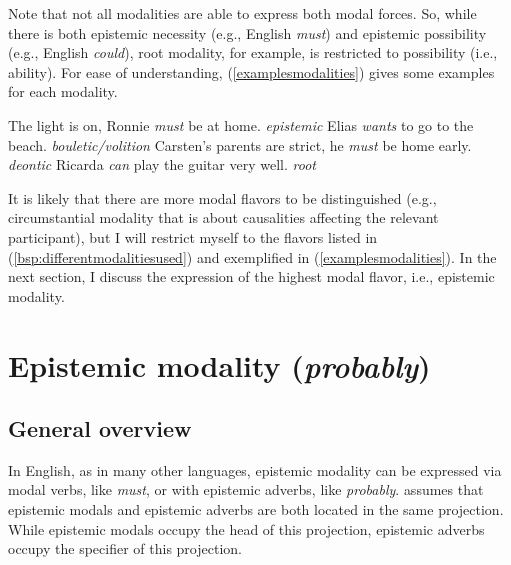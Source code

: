 \noindent Note that not all modalities are able to express both modal forces. So, while there is both epistemic necessity (e.g., English \textit{must}) and epistemic possibility (e.g., English \textit{could}), root modality, for example, is restricted to possibility (i.e., ability). For ease of understanding, (\ref{examplesmodalities}) gives some examples for each modality.

\begin{exe} 
\ex \label{examplesmodalities}\begin{xlist} 
\ex  The light is on, Ronnie \textit{must} be at home.  \hfill\textit{epistemic} \label{examplesmodalitiesa}
\ex  Elias \textit{wants} to go to the beach.  \hfill\textit{bouletic/volition} \label{examplesmodalitiesb}
\ex  Carsten's parents are strict, he \textit{must} be home early.  \hfill\textit{deontic} \label{examplesmodalitiesc}
\ex  Ricarda \textit{can} play the guitar very well.  \hfill\textit{root} \label{examplesmodalitiese}
\end{xlist} 
\end{exe} 

\noindent It is likely that there are more modal flavors to be distinguished (e.g., circumstantial modality that is about causalities affecting the relevant participant), but I will restrict myself to the flavors listed in (\ref{bsp:differentmodalitiesused}) and exemplified in (\ref{examplesmodalities}). In the next section, I discuss the expression of the highest modal flavor, i.e., epistemic modality.  

\section{Epistemic modality (\textit{probably})}\label{sectionepistemic}
\subsection{General overview}
In English, as in many other languages, epistemic modality can be expressed via modal verbs, like \textit{must}, or with epistemic adverbs, like \textit{probably}. \citet[86]{cinque1999adverbs} assumes that epistemic modals and epistemic adverbs are both located in the same projection. While epistemic modals occupy the head of this projection, epistemic adverbs occupy the specifier of this projection. 

